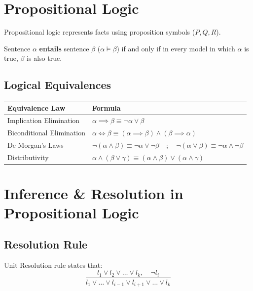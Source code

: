 \documentclass[12pt,a4paper]{article}
\renewcommand{\arraystretch}{1.45}
\begin{document}
\section{Propositional Logic}

Propositional logic represents facts using proposition symbols ($P, Q, R$).

\begin{tcolorbox}[defbox, title={Logical Entailment}]
  Sentence $\alpha$ \textbf{entails} sentence $\beta$ ($\alpha \models \beta$) if and only if in every model in which $\alpha$ is true, $\beta$ is also true.
\end{tcolorbox}

\subsection{Logical Equivalences}
\par\vspace{6pt}\noindent
{\renewcommand{\arraystretch}{1.4}%
\begin{tabularx}{\linewidth}{|B{3.5cm}|Y|}
\hline
\textbf{Equivalence Law} & \textbf{Formula} \\
\hline
Implication Elimination & $\alpha \implies \beta \equiv \neg \alpha \lor \beta$ \\
\hline
Biconditional Elimination & $\alpha \iff \beta \equiv (\alpha \implies \beta) \land (\beta \implies \alpha)$ \\
\hline
De Morgan's Laws & $\neg(\alpha \land \beta) \equiv \neg \alpha \lor \neg \beta \quad ; \quad \neg(\alpha \lor \beta) \equiv \neg \alpha \land \neg \beta$ \\
\hline
Distributivity & $\alpha \land (\beta \lor \gamma) \equiv (\alpha \land \beta) \lor (\alpha \land \gamma)$ \\
\hline
\end{tabularx}}

\section{Inference \& Resolution in Propositional Logic}

\subsection{Resolution Rule}
Unit Resolution rule states that:
\begin{equation}
  \frac{l_1 \lor l_2 \lor \dots \lor l_k, \quad \neg l_i}{l_1 \lor \dots \lor l_{i-1} \lor l_{i+1} \lor \dots \lor l_k}
\end{equation}
\end{document}
